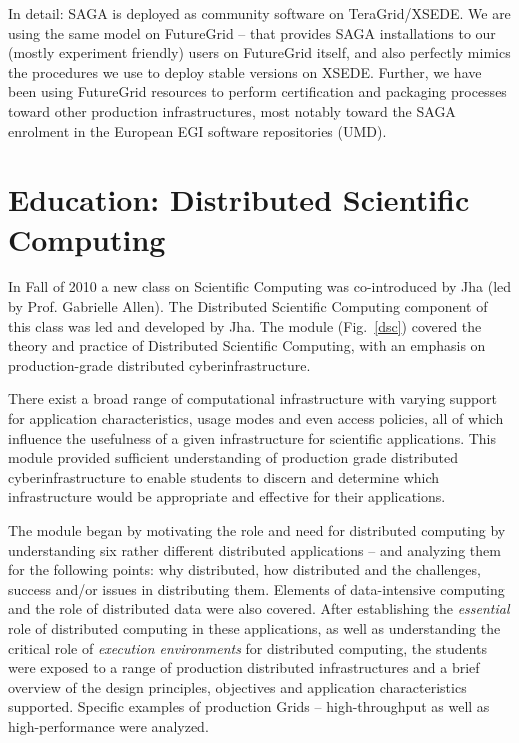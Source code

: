 \documentclass[]{paper}
\begin{document}
 In detail: SAGA is deployed as community software on TeraGrid/XSEDE.
 We are using the same model on FutureGrid -- that provides SAGA
 installations to our (mostly experiment friendly) users on FutureGrid
 itself, and also perfectly mimics the procedures we use to deploy
 stable versions on XSEDE.  Further, we have been using FutureGrid
 resources to perform certification and packaging processes toward
 other production infrastructures, most notably toward the SAGA
 enrolment in the European EGI software repositories (UMD).


\section{Education: Distributed Scientific Computing}
\label{sec:edu}

In Fall of 2010 a new class on Scientific Computing was co-introduced
by Jha (led by Prof. Gabrielle Allen). The Distributed Scientific
Computing component of this class was led and developed by Jha.  The
module (Fig.~\ref{dsc}) covered the theory and practice of Distributed
Scientific Computing, with an emphasis on production-grade distributed
cyberinfrastructure.

There exist a broad range of computational infrastructure with varying
support for application characteristics, usage modes and even access
policies, all of which influence the usefulness of a given
infrastructure for scientific applications.  This module provided
sufficient understanding of production grade distributed
cyberinfrastructure to enable students to discern and determine which
infrastructure would be appropriate and effective for their
applications.

The module began by motivating the role and need for distributed
computing by understanding six rather different distributed
applications -- and analyzing them for the following points: why
distributed, how distributed and the challenges, success and/or issues
in distributing them. Elements of data-intensive computing and the
role of distributed data were also covered.  After establishing the
{\it essential} role of distributed computing in these applications,
as well as understanding the critical role of {\it execution
  environments} for distributed computing, the students were exposed
to a range of production distributed infrastructures and a brief
overview of the design principles, objectives and application
characteristics supported.  Specific examples of production Grids --
high-throughput as well as high-performance were analyzed.
\end{document}
